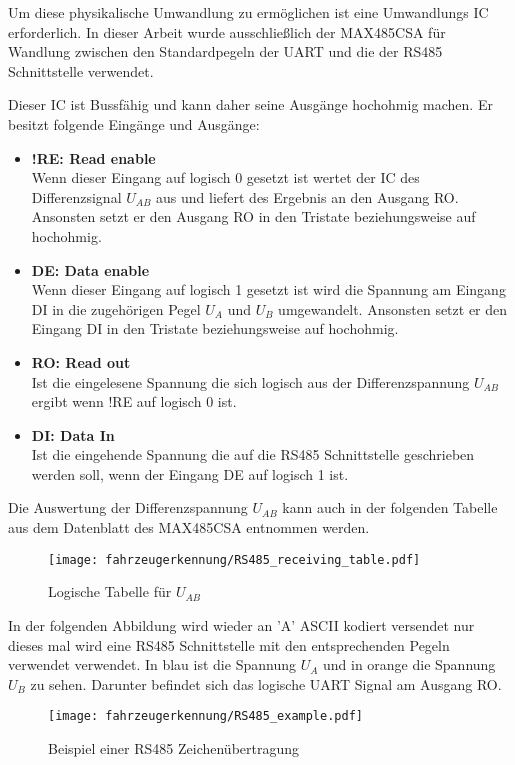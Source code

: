 Um diese physikalische Umwandlung zu ermöglichen ist eine Umwandlungs IC erforderlich. In dieser Arbeit wurde ausschließlich der MAX485CSA für Wandlung zwischen den Standardpegeln der UART
und die der RS485 Schnittstelle verwendet.

Dieser IC ist Bussfähig und kann daher seine Ausgänge hochohmig machen. Er besitzt folgende Eingänge und Ausgänge:
\begin{itemize}
    \item \textbf{!RE: Read enable} \\
    Wenn dieser Eingang auf logisch 0 gesetzt ist wertet der IC des Differenzsignal $U_{AB}$ aus und liefert des Ergebnis an den Ausgang RO.
    Ansonsten setzt er den Ausgang RO in den Tristate beziehungsweise auf hochohmig.
    \item \textbf{DE: Data enable} \\
    Wenn dieser Eingang auf logisch 1 gesetzt ist wird die Spannung am Eingang DI in die zugehörigen Pegel $U_{A}$ und $U_{B}$ umgewandelt.
    Ansonsten setzt er den Eingang DI in den Tristate beziehungsweise auf hochohmig.
    \item \textbf{RO: Read out} \\
    Ist die eingelesene Spannung die sich logisch aus der Differenzspannung $U_{AB}$ ergibt wenn !RE auf logisch 0 ist.
    \item \textbf{DI: Data In} \\
    Ist die eingehende Spannung die auf die RS485 Schnittstelle geschrieben werden soll, wenn der Eingang DE auf logisch 1 ist.
\end{itemize}

Die Auswertung der Differenzspannung $U_{AB}$ kann auch in der folgenden Tabelle aus dem Datenblatt des MAX485CSA entnommen werden. 

\begin{figure}[H]
    \centering
    \texttt{[image: fahrzeugerkennung/RS485\_receiving\_table.pdf]}
    \caption{Logische Tabelle für $U_{AB}$}
\end{figure}

In der folgenden Abbildung wird wieder an 'A' ASCII kodiert versendet nur dieses mal wird eine RS485 Schnittstelle mit den entsprechenden Pegeln verwendet verwendet.
In blau ist die Spannung $U_{A}$ und in orange die Spannung $U_{B}$ zu sehen. Darunter befindet sich das logische UART Signal am Ausgang RO. 

\begin{figure}[H]
    \centering
    \texttt{[image: fahrzeugerkennung/RS485\_example.pdf]}
    \caption{Beispiel einer RS485 Zeichenübertragung}
\end{figure}

